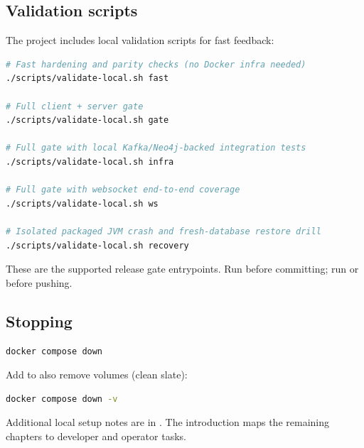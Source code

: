 \subsection{Validation scripts}

The project includes local validation scripts for fast feedback:

\begin{lstlisting}[language=bash,caption={Validation commands}]
# Fast hardening and parity checks (no Docker infra needed)
./scripts/validate-local.sh fast

# Full client + server gate
./scripts/validate-local.sh gate

# Full gate with local Kafka/Neo4j-backed integration tests
./scripts/validate-local.sh infra

# Full gate with websocket end-to-end coverage
./scripts/validate-local.sh ws

# Isolated packaged JVM crash and fresh-database restore drill
./scripts/validate-local.sh recovery
\end{lstlisting}

These are the supported release gate entrypoints. Run  before
committing; run  or  before pushing.

\subsection{Stopping}

\begin{lstlisting}[language=bash,caption={Stop infrastructure}]
docker compose down
\end{lstlisting}

Add  to also remove volumes (clean slate):

\begin{lstlisting}[language=bash,caption={Stop and remove volumes}]
docker compose down -v
\end{lstlisting}

Additional local setup notes are in . The introduction
maps the remaining chapters to developer and operator tasks.
